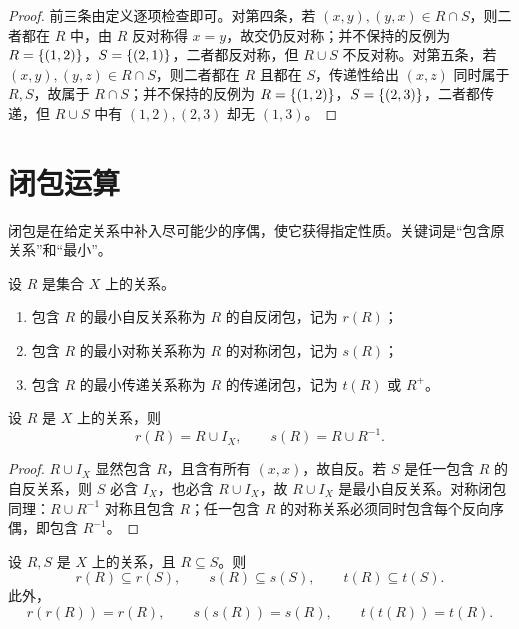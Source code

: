 \begin{proof}
前三条由定义逐项检查即可。对第四条，若 $(x,y),(y,x)\in R\cap S$，则二者都在 $R$ 中，由 $R$ 反对称得 $x=y$，故交仍反对称；并不保持的反例为 $R=\{(1,2)\}$，$S=\{(2,1)\}$，二者都反对称，但 $R\cup S$ 不反对称。对第五条，若 $(x,y),(y,z)\in R\cap S$，则二者都在 $R$ 且都在 $S$，传递性给出 $(x,z)$ 同时属于 $R,S$，故属于 $R\cap S$；并不保持的反例为 $R=\{(1,2)\}$，$S=\{(2,3)\}$，二者都传递，但 $R\cup S$ 中有 $(1,2),(2,3)$ 却无 $(1,3)$。
\end{proof}

\section{闭包运算}

闭包是在给定关系中补入尽可能少的序偶，使它获得指定性质。关键词是“包含原关系”和“最小”。

\begin{definition}\label{ch2-closures}
设 $R$ 是集合 $X$ 上的关系。
\begin{enumerate}
  \item 包含 $R$ 的最小自反关系称为 $R$ 的自反闭包，记为 $r(R)$；
  \item 包含 $R$ 的最小对称关系称为 $R$ 的对称闭包，记为 $s(R)$；
  \item 包含 $R$ 的最小传递关系称为 $R$ 的传递闭包，记为 $t(R)$ 或 $R^+$。
\end{enumerate}
\end{definition}

\begin{theorem}[自反闭包与对称闭包公式]\label{ch2-rs-closures}
设 $R$ 是 $X$ 上的关系，则
\[
  r(R)=R\cup I_X,\qquad s(R)=R\cup R^{-1}.
\]
\end{theorem}

\begin{proof}
$R\cup I_X$ 显然包含 $R$，且含有所有 $(x,x)$，故自反。若 $S$ 是任一包含 $R$ 的自反关系，则 $S$ 必含 $I_X$，也必含 $R\cup I_X$，故 $R\cup I_X$ 是最小自反关系。对称闭包同理：$R\cup R^{-1}$ 对称且包含 $R$；任一包含 $R$ 的对称关系必须同时包含每个反向序偶，即包含 $R^{-1}$。
\end{proof}

\begin{theorem}[闭包运算的基本性质]\label{ch2-closure-laws}
设 $R,S$ 是 $X$ 上的关系，且 $R\subseteq S$。则
\[
  r(R)\subseteq r(S),\qquad s(R)\subseteq s(S),\qquad t(R)\subseteq t(S).
\]
此外，
\[
  r(r(R))=r(R),\qquad s(s(R))=s(R),\qquad t(t(R))=t(R).
\]
\end{theorem}

